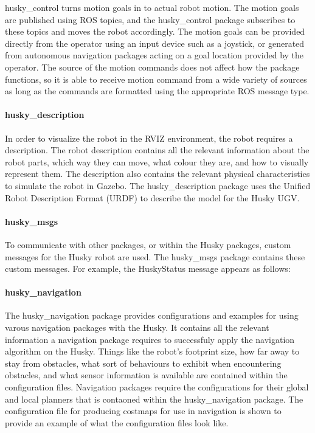 husky\_control turns motion goals in to actual robot motion. The motion goals are published using ROS topics, and the husky\_control package subscribes to these topics and moves the robot accordingly. The motion goals can be provided directly from the operator using an input device such as a joystick, or generated from autonomous navigation packages acting on a goal location provided by the operator. The source of the motion commands does not affect how the package functions, so it is able to receive motion command from a wide variety of sources as long as the commands are formatted using the appropriate ROS message type.\\ 

\paragraph{husky\_description}

In order to visualize the robot in the RVIZ environment, the robot requires a description. The robot description contains all the relevant information about the robot parts, which way they can move, what colour they are, and how to visually represent them. The description also contains the relevant physical characteristics to simulate the robot in Gazebo. The husky\_description package uses the Unified Robot Description Format (URDF) to describe the model for the Husky UGV.\\

\paragraph{husky\_msgs}

To communicate with other packages, or within the Husky packages, custom messages for the Husky robot are used. The husky\_msgs package contains these custom messages. For example, the HuskyStatus message appears as follows:


\paragraph{husky\_navigation}

The husky\_navigation package provides configurations and examples for using varous navigation packages with the Husky. It contains all the relevant information a navigation package requires to successfuly apply the navigation algorithm on the Husky. Things like the robot's footprint size, how far away to stay from obstacles, what sort of behaviours to exhibit when encountering obstacles, and what sensor information is available are contained within the configuration files. Navigation packages require the configurations for their global and local planners that is contaoned within the husky\_navigation package. The configuration file for producing costmaps for use in navigation is shown to provide an example of what the configuration files look like.\\

